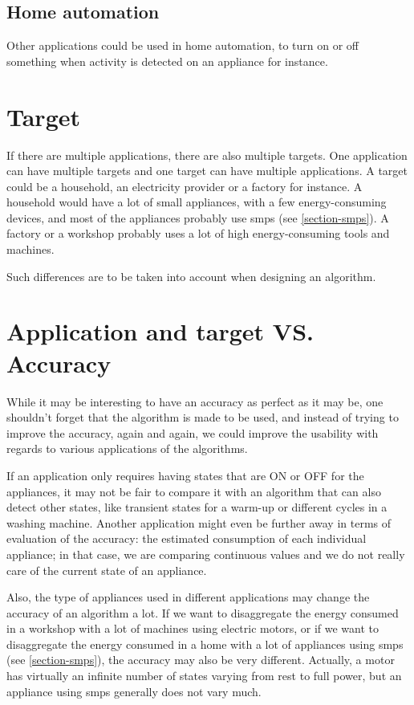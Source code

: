 \subsection{Home automation}
Other applications could be used in home automation, to turn on or off something when activity is detected on an appliance for instance.


\section{Target}\label{section-target}
If there are multiple applications, there are also multiple targets. One application can have multiple targets and one target can have multiple applications. A target could be a household, an electricity provider or a factory for instance. A household would have a lot of small appliances, with a few energy-consuming devices, and most of the appliances probably use \acrshort{smps} (see \autoref{section-smps}). A factory or a workshop probably uses a lot of high energy-consuming tools and machines.

Such differences are to be taken into account when designing an algorithm.


\section{Application and target VS. Accuracy}
While it may be interesting to have an accuracy as perfect as it may be, one shouldn't forget that the algorithm is made to be used, and instead of trying to improve the accuracy, again and again, we could improve the usability with regards to various applications of the algorithms. \cite{barker2014nilm} 

If an application only requires having states that are ON or OFF for the appliances, it may not be fair to compare it with an algorithm that can also detect other states, like transient states for a warm-up or different cycles in a washing machine. Another application might even be further away in terms of evaluation of the accuracy: the estimated consumption of each individual appliance; in that case, we are comparing continuous values and we do not really care of the current state of an appliance.

Also, the type of appliances used in different applications may change the accuracy of an algorithm a lot. If we want to disaggregate the energy consumed in a workshop with a lot of machines using electric motors, or if we want to disaggregate the energy consumed in a home with a lot of appliances using \acrshort{smps} (see \autoref{section-smps}), the accuracy may also be very different. Actually, a motor has virtually an infinite number of states varying from rest to full power, but an appliance using \acrshort{smps} generally does not vary much.

